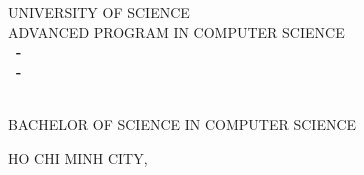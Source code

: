 \begin{titlepage}

\begin{center}
UNIVERSITY OF SCIENCE\\
ADVANCED PROGRAM IN COMPUTER SCIENCE\\[2cm]

{ \Large \bfseries \MakeUppercase{\tenSV ~-~ \mssv} \\
\Large \bfseries \MakeUppercase{\tenSVt ~-~ \mssvt} \\[2cm] } %
{ \LARGE \bfseries \MakeUppercase{\tenKL} \\[2cm] } %

\Large BACHELOR OF SCIENCE IN COMPUTER SCIENCE\\[2cm]



\vfill
HO CHI MINH CITY, \the\year

\end{center}

\end{titlepage}
